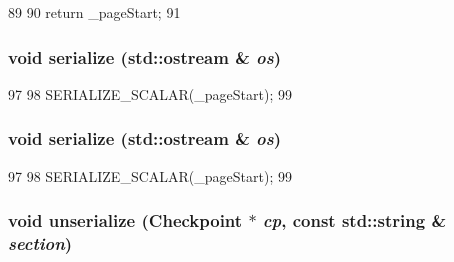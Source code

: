 \begin{DoxyCode}
89     {
90         return _pageStart;
91     }
\end{DoxyCode}
\hypertarget{structMipsISA_1_1TlbEntry_a53e036786d17361be4c7320d39c99b84}{
\subsubsection[{serialize}]{\setlength{\rightskip}{0pt plus 5cm}void serialize (std::ostream \& {\em os})}}
\label{structMipsISA_1_1TlbEntry_a53e036786d17361be4c7320d39c99b84}



\begin{DoxyCode}
97     {
98         SERIALIZE_SCALAR(_pageStart);
99     }
\end{DoxyCode}
\hypertarget{structMipsISA_1_1TlbEntry_a53e036786d17361be4c7320d39c99b84}{
\subsubsection[{serialize}]{\setlength{\rightskip}{0pt plus 5cm}void serialize (std::ostream \& {\em os})}}
\label{structMipsISA_1_1TlbEntry_a53e036786d17361be4c7320d39c99b84}



\begin{DoxyCode}
97     {
98         SERIALIZE_SCALAR(_pageStart);
99     }
\end{DoxyCode}
\hypertarget{structMipsISA_1_1TlbEntry_af22e5d6d660b97db37003ac61ac4ee49}{
\subsubsection[{unserialize}]{\setlength{\rightskip}{0pt plus 5cm}void unserialize ({\bf Checkpoint} $\ast$ {\em cp}, \/  const std::string \& {\em section})}}
\label{structMipsISA_1_1TlbEntry_af22e5d6d660b97db37003ac61ac4ee49}




